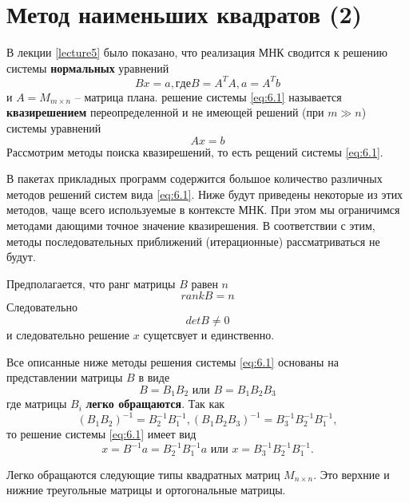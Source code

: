 \section{Метод наименьших квадратов (2)}
\label{lecture:6}

В лекции \ref{lecture5} было показано, что реализация МНК сводится к решению системы \textbf{нормальных} уравнений 
\begin{equation} \label{eq:6.1}
	Bx = a, где B = A^TA, a = A^Tb
\end{equation}
и $A=M_{m \times n}$  -- матрица плана. решение системы \ref{eq:6.1} называется \textbf{квазирешением} переопределенной и не имеющей решений (при $m\gg n$) системы уравнений 
\begin{equation}
	Ax = b
\end{equation}
Рассмотрим методы поиска квазирешений, то есть рещений системы \ref{eq:6.1}. 

В пакетах прикладных программ содержится большое количество различных методов решений систем вида \ref{eq:6.1}. Ниже будут приведены некоторые из этих методов, чаще всего используемые в контексте МНК. При этом мы ограничимся методами дающими точное значение квазирешения. В соответствии с этим, методы последовательных приближений (итерационные) рассматриваться не будут.

Предполагается, что ранг матрицы $B$ равен $n$
\begin{equation} 
	rank B = n
\end{equation}
Следовательно
\begin{equation}
	det B \neq 0
\end{equation}
и следовательно решение $x$ сущетсвует и единственно.

Все описанные ниже методы решения системы \ref{eq:6.1} основаны на представлении матрицы $B$ в виде
\begin{equation} 
	B = B_1 B_2 \text{ или } B = B_1 B_2 B_3
\end{equation}
где матрицы $B_i$ \textbf{легко обращаются}.
Так как
\begin{equation} 
	(B_1B_2)^{-1} = B_2^{-1} B_1^{-1}, (B_1B_2B_3)^{-1} = B_3^{-1}B_2^{-1} B_1^{-1},
\end{equation}
то решение системы \ref{eq:6.1} имеет вид
\begin{equation}
	x = B^{-1} a = B_2^{-1} B_1^{-1} a \text{ или } x = B_3^{-1}B_2^{-1} B_1^{-1}.
\end{equation}

Легко обращаются следующие типы квадратных матриц $M_{n \times n}$. Это верхние и нижние треугольные матрицы и ортогональные матрицы.


